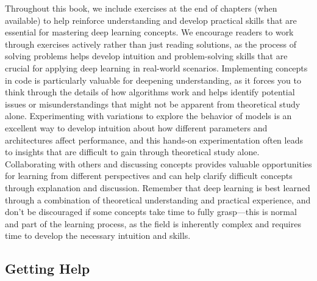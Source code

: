 Throughout this book, we include exercises at the end of chapters (when available) to help reinforce understanding and develop practical skills that are essential for mastering deep learning concepts. We encourage readers to work through exercises actively rather than just reading solutions, as the process of solving problems helps develop intuition and problem-solving skills that are crucial for applying deep learning in real-world scenarios. Implementing concepts in code is particularly valuable for deepening understanding, as it forces you to think through the details of how algorithms work and helps identify potential issues or misunderstandings that might not be apparent from theoretical study alone. Experimenting with variations to explore the behavior of models is an excellent way to develop intuition about how different parameters and architectures affect performance, and this hands-on experimentation often leads to insights that are difficult to gain through theoretical study alone. Collaborating with others and discussing concepts provides valuable opportunities for learning from different perspectives and can help clarify difficult concepts through explanation and discussion. Remember that deep learning is best learned through a combination of theoretical understanding and practical experience, and don't be discouraged if some concepts take time to fully grasp---this is normal and part of the learning process, as the field is inherently complex and requires time to develop the necessary intuition and skills.

\subsection{Getting Help}

